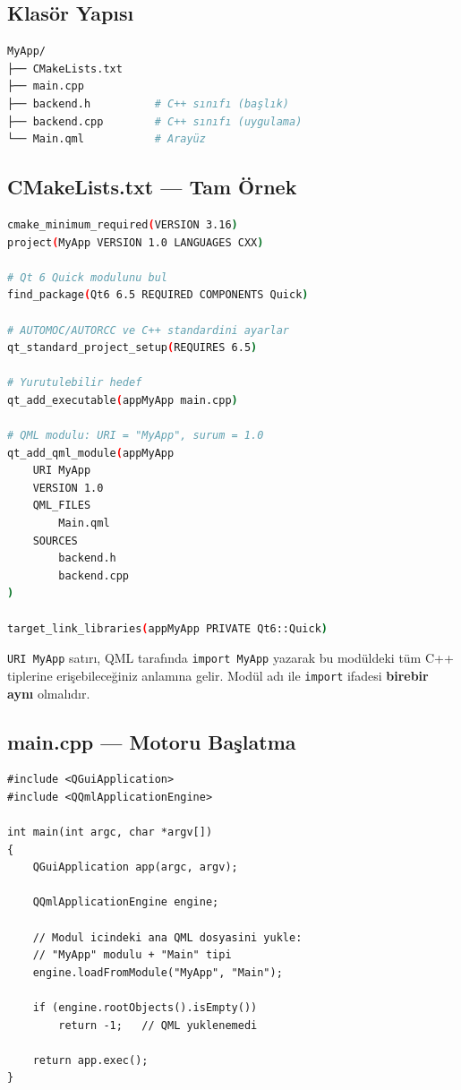 \documentclass[11pt,a4paper]{article}
\newcommand{\kod}[1]{\texttt{\color{koyuGri}#1}}
\begin{document}
\subsection{Klasör Yapısı}

\begin{lstlisting}[language=bash,basicstyle=\codefont\small,keywordstyle=\color{koyuGri}]
MyApp/
├── CMakeLists.txt
├── main.cpp
├── backend.h          # C++ sınıfı (başlık)
├── backend.cpp        # C++ sınıfı (uygulama)
└── Main.qml           # Arayüz
\end{lstlisting}

\subsection{CMakeLists.txt — Tam Örnek}

\begin{lstlisting}[language=bash,morekeywords={cmake_minimum_required,project,find_package,qt_standard_project_setup,qt_add_executable,qt_add_qml_module,target_link_libraries,VERSION,COMPONENTS,REQUIRED,PRIVATE},keywordstyle=\color{vurguMavi}\bfseries]
cmake_minimum_required(VERSION 3.16)
project(MyApp VERSION 1.0 LANGUAGES CXX)

# Qt 6 Quick modulunu bul
find_package(Qt6 6.5 REQUIRED COMPONENTS Quick)

# AUTOMOC/AUTORCC ve C++ standardini ayarlar
qt_standard_project_setup(REQUIRES 6.5)

# Yurutulebilir hedef
qt_add_executable(appMyApp main.cpp)

# QML modulu: URI = "MyApp", surum = 1.0
qt_add_qml_module(appMyApp
    URI MyApp
    VERSION 1.0
    QML_FILES
        Main.qml
    SOURCES
        backend.h
        backend.cpp
)

target_link_libraries(appMyApp PRIVATE Qt6::Quick)
\end{lstlisting}

\begin{notkutu}
\kod{URI MyApp} satırı, QML tarafında \kod{import MyApp} yazarak bu modüldeki
tüm C++ tiplerine erişebileceğiniz anlamına gelir. Modül adı ile \kod{import}
ifadesi \textbf{birebir aynı} olmalıdır.
\end{notkutu}

\subsection{main.cpp — Motoru Başlatma}

\begin{lstlisting}
#include <QGuiApplication>
#include <QQmlApplicationEngine>

int main(int argc, char *argv[])
{
    QGuiApplication app(argc, argv);

    QQmlApplicationEngine engine;

    // Modul icindeki ana QML dosyasini yukle:
    // "MyApp" modulu + "Main" tipi
    engine.loadFromModule("MyApp", "Main");

    if (engine.rootObjects().isEmpty())
        return -1;   // QML yuklenemedi

    return app.exec();
}
\end{lstlisting}
\end{document}
